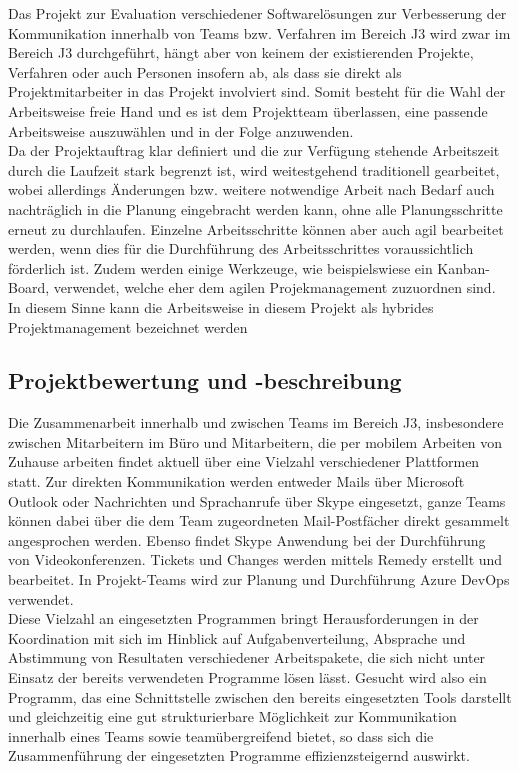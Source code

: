 \documentclass[ThesisDJ.tex]{subfiles}
\begin{document}
	Das Projekt zur Evaluation verschiedener Softwarelösungen zur Verbesserung der Kommunikation innerhalb von Teams bzw. Verfahren im Bereich J3 wird zwar im Bereich J3 durchgeführt, hängt aber von keinem der existierenden Projekte, Verfahren oder auch Personen insofern ab, als dass sie direkt als Projektmitarbeiter in das Projekt involviert sind. Somit besteht für die Wahl der Arbeitsweise freie Hand und es ist dem Projektteam überlassen, eine passende Arbeitsweise auszuwählen und in der Folge anzuwenden.\\
	Da der Projektauftrag klar definiert und die zur Verfügung stehende Arbeitszeit durch die Laufzeit stark begrenzt ist, wird weitestgehend traditionell gearbeitet, wobei allerdings Änderungen bzw. weitere notwendige Arbeit nach Bedarf auch nachträglich in die Planung eingebracht werden kann, ohne alle Planungsschritte erneut zu durchlaufen. Einzelne Arbeitsschritte können aber auch agil bearbeitet werden, wenn dies für die Durchführung des Arbeitsschrittes voraussichtlich förderlich ist. Zudem werden einige Werkzeuge, wie beispielswiese ein Kanban-Board, verwendet, welche eher dem agilen Projekmanagement zuzuordnen sind. In diesem Sinne kann die Arbeitsweise in diesem Projekt
	als hybrides Projektmanagement bezeichnet werden \cite{Kuster2022}
	
	\subsection{Projektbewertung und -beschreibung}
	Die Zusammenarbeit innerhalb und zwischen Teams im Bereich J3, insbesondere zwischen Mitarbeitern im Büro und Mitarbeitern, die per mobilem Arbeiten von Zuhause arbeiten findet aktuell über eine Vielzahl verschiedener Plattformen statt. Zur direkten Kommunikation werden entweder Mails über Microsoft Outlook oder Nachrichten und Sprachanrufe über Skype eingesetzt, ganze Teams können dabei über die dem Team zugeordneten Mail-Postfächer direkt gesammelt angesprochen werden. Ebenso findet Skype Anwendung bei der Durchführung von Videokonferenzen. Tickets und Changes werden mittels Remedy erstellt und bearbeitet. In Projekt-Teams wird zur Planung und Durchführung Azure DevOps verwendet. \\
	Diese Vielzahl an eingesetzten Programmen bringt Herausforderungen in der Koordination mit sich im Hinblick auf Aufgabenverteilung, Absprache und Abstimmung von Resultaten verschiedener Arbeitspakete, die sich nicht unter Einsatz der bereits verwendeten Programme lösen lässt.
	Gesucht wird also ein Programm, das eine Schnittstelle zwischen den bereits eingesetzten Tools darstellt und gleichzeitig eine gut strukturierbare Möglichkeit zur Kommunikation innerhalb eines Teams sowie teamübergreifend bietet, so dass sich die Zusammenführung der eingesetzten Programme effizienzsteigernd auswirkt.
	
\end{document}
